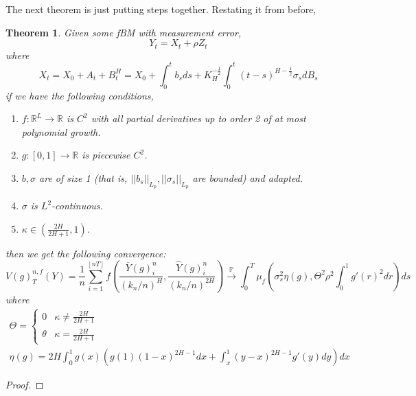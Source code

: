 \documentclass[12pt,letterpaper]{article}
\newtheorem{theorem}{Theorem}
\theoremstyle{definition}
\newcommand{\R}{\mathbb{R}}
\begin{document}
The next theorem is just putting steps together. Restating it from before,
\begin{theorem}
  Given some fBM with measurement error,
  \begin{equation}
    Y_t = X_t + \rho Z_t
  \end{equation}
  where
  \begin{equation}
    X_t = X_0 + A_t + B_t^H = X_0 + \int_0^tb_sds + K_H^{-\frac{1}{2}}\int_0^t(t-s)^{H - \frac{1}{2}}\sigma_sdB_s
  \end{equation}
  if we have the following conditions, %
  \begin{enumerate}
    \item \(f: \R^L \rightarrow \R\) is \(C^2\) with all partial derivatives up to order 2 of at most polynomial growth.
    \item \(g: [0,1] \rightarrow \R\) is piecewise \(C^2\).
    \item \(b, \sigma\) are of size 1 (that is, \(||b_s||_{L_p}, ||\sigma_s||_{L_p}\) are bounded) and adapted.
    \item \(\sigma\) is \(L^2\)-continuous.
    \item \(\kappa \in \left(\frac{2H}{2H+1}, 1\right)\).
  \end{enumerate}
  then we get the following convergence:
  \begin{equation}
    V(g)^{n,f}_T(Y) = \frac{1}{n}\sum_{i=1}^{\left\lfloor nT \right\rfloor}f\left( \frac{\overline{Y}(g)^n_i}{\left( k_n/n \right)^H}, \frac{\widehat{Y}(g)^n_i}{\left( k_n/n \right)^{2H}} \right) \overset{\mathbb{P}}{\rightarrow} \int_0^T \mu_f\left( \sigma_s^2\eta\left( g \right), \Theta^2\rho^2 \int_0^1g'(r)^2dr \right)ds
  \end{equation}
  where
  \begin{gather}
    \Theta =
    \begin{cases}
      0 & \kappa \neq \frac{2H}{2H+1} \\
      \theta &  \kappa = \frac{2H}{2H+1}
    \end{cases} \\
    \eta(g) = 2H\int_0^1g(x)\left(g(1)(1-x)^{2H-1}dx + \int_x^1(y-x)^{2H-1}g'(y)dy\right)dx
  \end{gather}
\end{theorem}

\begin{proof}

\end{proof}
\end{document}
